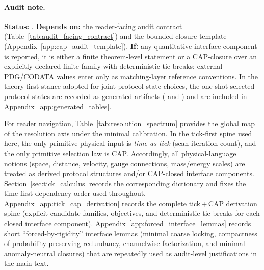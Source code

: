 \paragraph{Audit note.}
\AuditTag \textbf{Status:} \AuditTag.
\textbf{Depends on:} the reader-facing audit contract (Table~\ref{tab:audit_facing_contract}) and the bounded-closure template (Appendix~\ref{app:cap_audit_template}).
\textbf{If:} any quantitative interface component is reported, it is either a finite theorem-level statement or a CAP-closure over an explicitly declared finite family with deterministic tie-breaks; external PDG/CODATA values enter only as matching-layer reference conventions.
\AuditTag In the theory-first stance adopted for joint protocol-state choices, the one-shot selected protocol states are recorded as generated artifacts ( and ) and are included in Appendix~\ref{app:generated_tables}.

For reader navigation, Table~\ref{tab:resolution_spectrum} provides the global map of the resolution axis under the minimal calibration.
In the tick-first spine used here, the only primitive physical input is \emph{time as tick} (scan iteration count), and the only primitive selection law is CAP.
Accordingly, all physical-language notions (space, distance, velocity, gauge connections, mass/energy scales) are treated as derived protocol structures and/or CAP-closed interface components.
Section~\ref{sec:tick_calculus} records the corresponding dictionary and fixes the time-first dependency order used throughout.
Appendix~\ref{app:tick_cap_derivation} records the complete tick\,+\,CAP derivation spine (explicit candidate families, objectives, and deterministic tie-breaks for each closed interface component).
Appendix~\ref{app:forced_interface_lemmas} records short ``forced-by-rigidity'' interface lemmas (minimal coarse locking, compactness of probability-preserving redundancy, channelwise factorization, and minimal anomaly-neutral closures) that are repeatedly used as audit-level justifications in the main text.


